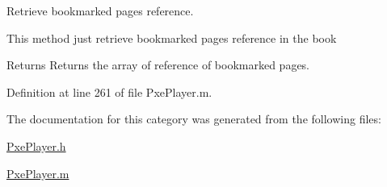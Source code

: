 Retrieve bookmarked pages reference.

This method just retrieve bookmarked pages reference in the book

\begin{DoxyReturn}{Returns}
Returns the array of reference of bookmarked pages. 
\end{DoxyReturn}


Definition at line 261 of file Pxe\-Player.\-m.



The documentation for this category was generated from the following files\-:\begin{DoxyCompactItemize}
\item 
\hyperlink{_pxe_player_8h}{Pxe\-Player.\-h}\item 
\hyperlink{_pxe_player_8m}{Pxe\-Player.\-m}\end{DoxyCompactItemize}
